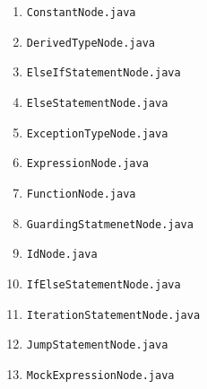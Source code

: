 \documentclass{book}
\begin{document}
\begin{itemize}
\begin{enumerate}
\begin{quotation}
\end{quotation}
\item \texttt{ConstantNode.java}
\begin{quotation}
\noindent 
\end{quotation}
\item \texttt{DerivedTypeNode.java}
\begin{quotation}
\noindent 
\end{quotation}
\item \texttt{ElseIfStatementNode.java}
\begin{quotation}
\noindent 
\end{quotation}
\item \texttt{ElseStatementNode.java}
\begin{quotation}
\noindent 
\end{quotation}
\item \texttt{ExceptionTypeNode.java}
\begin{quotation}
\noindent 
\end{quotation}
\item \texttt{ExpressionNode.java}
\begin{quotation}
\noindent 
\end{quotation}
\item \texttt{FunctionNode.java}
\begin{quotation}
\noindent 
\end{quotation}
\item \texttt{GuardingStatmenetNode.java}
\begin{quotation}
\noindent 
\end{quotation}
\item \texttt{IdNode.java}
\begin{quotation}
\noindent 
\end{quotation}
\item \texttt{IfElseStatementNode.java}
\begin{quotation}
\noindent 
\end{quotation}
\item \texttt{IterationStatementNode.java}
\begin{quotation}
\noindent 
\end{quotation}
\item \texttt{JumpStatementNode.java}
\begin{quotation}
\noindent 
\end{quotation}
\item \texttt{MockExpressionNode.java}
\begin{quotation}

\end{quotation}
\end{enumerate}
\end{itemize}
\end{document}
